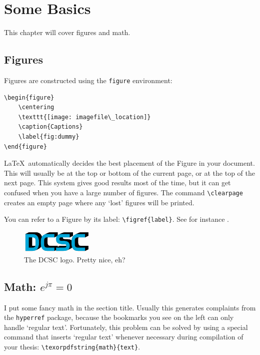 %
\chapter{Some Basics}

This chapter will cover figures and math. 

\section{Figures}

Figures are constructed using the \texttt{figure} environment:
\begin{verbatim}
\begin{figure}
	\centering
	\texttt{[image: imagefile\_location]}
	\caption{Captions}
	\label{fig:dummy}
\end{figure}
\end{verbatim}

\LaTeX\ automatically decides the best placement of the Figure in your document. This will usually be at the top or bottom of the current page, or at the top of the next page. This system gives good results most of the time, but it can get confused when you have a large number of figures. The command \verb"\clearpage" creates an empty page where any `lost' figures will be printed.

You can refer to a Figure by its label: \verb"\figref{label}". See for instance .

\begin{figure}
	\centering
	\includegraphics[width=0.31415\textwidth]{STYLESTUFF/DCSC}
	\caption{The \acs{DCSC} logo. Pretty nice, eh?}
	\label{fig:dummy}
\end{figure}

\section{Math: \texorpdfstring{$e^{j \pi}=0$}{``Euler's identity''}}

I put some fancy math in the section title. Usually this generates complaints from the \texttt{hyperref} package, because the bookmarks you see on the left can only handle `regular text'. Fortunately, this problem can be solved by using a special command that inserts `regular text' whenever necessary during compilation of your thesis: \verb"\texorpdfstring{math}{text}".

